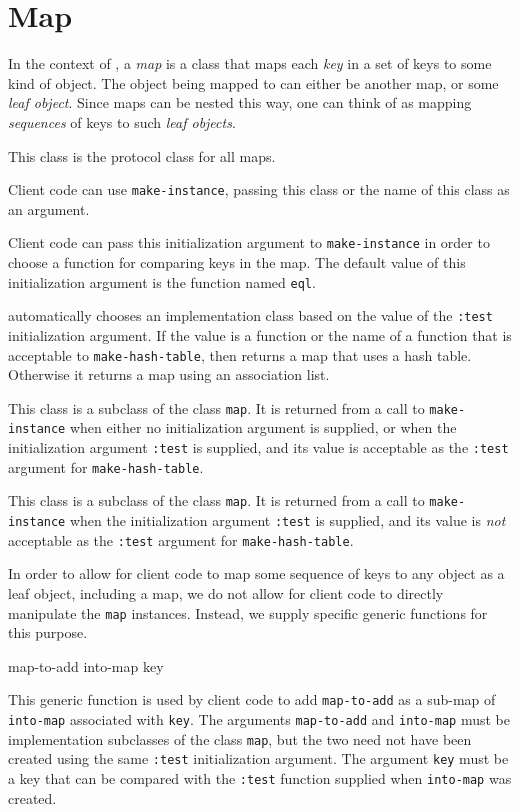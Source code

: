\chapter{Map}

In the context of \sysname{}, a \emph{map} is a class that maps
each \emph{key} in a set of keys to some kind of object.  The object
being mapped to can either be another map, or some \emph{leaf
  object}.  Since maps can be nested this way, one can think of
\sysname{} as mapping \emph{sequences} of keys to such \emph{leaf
  objects}.


This class is the protocol class for all maps.

Client code can use \texttt{make-instance}, passing this class or the
name of this class as an argument.


Client code can pass this initialization argument to
\texttt{make-instance} in order to choose a function for comparing
keys in the map.  The default value of this initialization argument is
the function named \texttt{eql}.

\sysname{} automatically chooses an implementation class based on the
value of the \texttt{:test} initialization argument.  If the value is
a function or the name of a function that is acceptable to
\texttt{make-hash-table}, then \sysname{} returns a map that uses a
hash table.  Otherwise it returns a map using an association list.


This class is a subclass of the class \texttt{map}.  It is returned
from a call to \texttt{make-instance} when either no initialization
argument is supplied, or when the initialization argument
\texttt{:test} is supplied, and its value is acceptable as the
\texttt{:test} argument for \texttt{make-hash-table}.


This class is a subclass of the class \texttt{map}.  It is returned
from a call to \texttt{make-instance} when the initialization argument
\texttt{:test} is supplied, and its value is \emph{not} acceptable as
the \texttt{:test} argument for \texttt{make-hash-table}.

In order to allow for client code to map some sequence of keys to any
\commonlisp{} object as a leaf object, including a \sysname{} map, we
do not allow for client code to directly manipulate the \texttt{map}
instances.  Instead, we supply specific generic functions for this
purpose.

 {map-to-add into-map key}

This generic function is used by client code to add
\texttt{map-to-add} as a sub-map of \texttt{into-map} associated with
\texttt{key}.  The arguments \texttt{map-to-add} and \texttt{into-map}
must be implementation subclasses of the class \texttt{map}, but the
two need not have been created using the same \texttt{:test}
initialization argument.  The argument \texttt{key} must be a key that
can be compared with the \texttt{:test} function supplied when
\texttt{into-map} was created.
